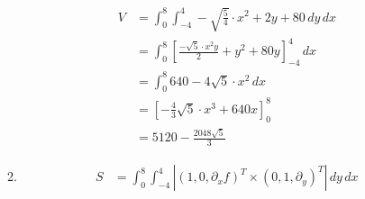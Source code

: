 \documentclass[]{book}
\theoremstyle{definition}
\begin{document}
\begin{enumerate}
\begin{enumerate}
\begin{align*}
            V & = \int_0^8 \int_{-4}^4 -\sqrt{\frac{5}{4}} \cdot x^2 + 2y + 80\,dy\,dx \\
            & = \int_0^8 [\frac{-\sqrt{5} \cdot x^2y}{2} + y^2 + 80y]_{-4}^4\,dx \\
            & = \int_0^8 640-4\sqrt{5}\cdot x^2 \, dx \\
            & = [-\frac{4}{3}\sqrt{5} \cdot x^3 + 640x]_0^8 \\
            & = 5120-\frac{2048\sqrt{5}}{3} 
            \end{align*}
        \item \begin{align*}
            S & = \int_0^8 \int_{-4}^4 |(1, 0, \partial_xf)^T \times (0, 1, \partial_y)^T|\,dy\,dx
        \end{align*}
    \end{enumerate}
\end{enumerate}
\end{document}
